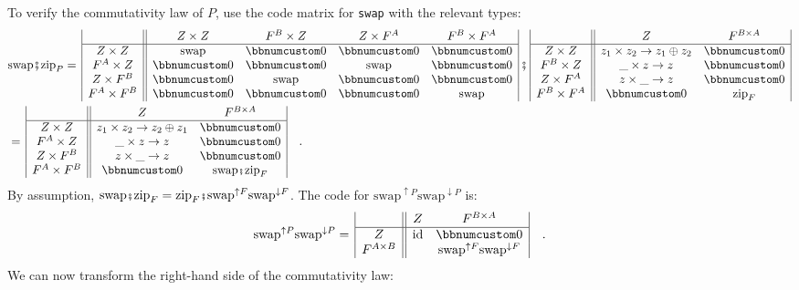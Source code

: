 To verify the commutativity law of $P$, use the code matrix for \lstinline!swap!
with the relevant types:
\begin{align*}
 & \text{swap}\bef\text{zip}_{P}=\,\begin{array}{|c||cccc|}
 & Z\times Z & F^{B}\times Z & Z\times F^{A} & F^{B}\times F^{A}\\
\hline Z\times Z & \text{swap} & \bbnum 0 & \bbnum 0 & \bbnum 0\\
F^{A}\times Z & \bbnum 0 & \bbnum 0 & \text{swap} & \bbnum 0\\
Z\times F^{B} & \bbnum 0 & \text{swap} & \bbnum 0 & \bbnum 0\\
F^{A}\times F^{B} & \bbnum 0 & \bbnum 0 & \bbnum 0 & \text{swap}
\end{array}\,\bef\,\begin{array}{|c||cc|}
 & Z & F^{B\times A}\\
\hline Z\times Z & z_{1}\times z_{2}\rightarrow z_{1}\oplus z_{2} & \bbnum 0\\
F^{B}\times Z & \_\times z\rightarrow z & \bbnum 0\\
Z\times F^{A} & z\times\_\rightarrow z & \bbnum 0\\
F^{B}\times F^{A} & \bbnum 0 & \text{zip}_{F}
\end{array}\\
 & =\,\begin{array}{|c||cc|}
 & Z & F^{B\times A}\\
\hline Z\times Z & z_{1}\times z_{2}\rightarrow z_{2}\oplus z_{1} & \bbnum 0\\
F^{A}\times Z & \_\times z\rightarrow z & \bbnum 0\\
Z\times F^{B} & z\times\_\rightarrow z & \bbnum 0\\
F^{A}\times F^{B} & \bbnum 0 & \text{swap}\bef\text{zip}_{F}
\end{array}\quad.
\end{align*}
By assumption, $\text{swap}\bef\text{zip}_{F}=\text{zip}_{F}\bef\text{swap}^{\uparrow F}\text{swap}^{\downarrow F}$.
The code for $\text{swap}^{\uparrow P}\text{swap}^{\downarrow P}$
is:
\[
\text{swap}^{\uparrow P}\text{swap}^{\downarrow P}=\,\begin{array}{|c||cc|}
 & Z & F^{B\times A}\\
\hline Z & \text{id} & \bbnum 0\\
F^{A\times B} &  & \text{swap}^{\uparrow F}\text{swap}^{\downarrow F}
\end{array}\quad.
\]
We can now transform the right-hand side of the commutativity law:
